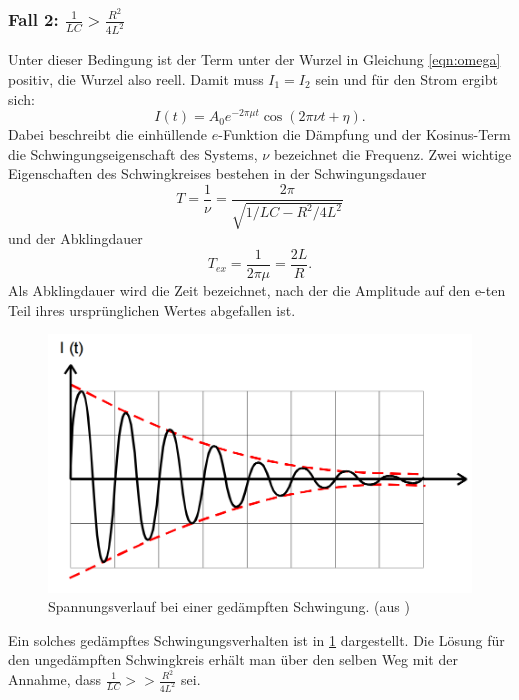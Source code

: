 \subsubsection{Fall 2: $\frac{1}{LC}>\frac{R^2}{4L^2}$}
Unter dieser Bedingung ist der Term unter der Wurzel in Gleichung
\ref{eqn:omega} positiv,
die Wurzel also reell. Damit muss $I_1 = I_2$ sein und für den Strom ergibt
sich:
\begin{equation}
  I(t) = A_0e^{-2\pi \mu t}\cos{(2\pi \nu t + \eta)}.
  \label{eqn:Ischwingung}
\end{equation}
Dabei beschreibt die einhüllende $e$-Funktion die Dämpfung und der
Kosinus-Term die Schwingungseigenschaft des Systems, $\nu$ bezeichnet die
Frequenz.
Zwei wichtige Eigenschaften des Schwingkreises bestehen in der Schwingungsdauer
\begin{equation}
  T =\frac{1}{\nu} = \frac{2\pi}{\sqrt{1/LC - R^2/4L^2}}
\end{equation}
und der Abklingdauer
\begin{equation}
  T_{ex} = \frac{1}{2\pi\mu} = \frac{2L}{R}.
\end{equation}
Als Abklingdauer wird die Zeit bezeichnet, nach der die Amplitude auf den e-ten
Teil ihres ursprünglichen Wertes abgefallen ist.

\begin{figure}
  \centering
  \includegraphics[width=\textwidth]{gedschwingung.png}
  \caption{Spannungsverlauf bei einer gedämpften Schwingung.
  (aus \cite{protokoll})}
  \label{fig:gedschw}
\end{figure}
Ein solches gedämpftes Schwingungsverhalten ist in \ref{fig:gedschw} dargestellt.
Die Lösung für den ungedämpften Schwingkreis erhält man über den selben Weg mit
der Annahme, dass $\frac{1}{LC} >> \frac{R^2}{4L^2}$ sei.

